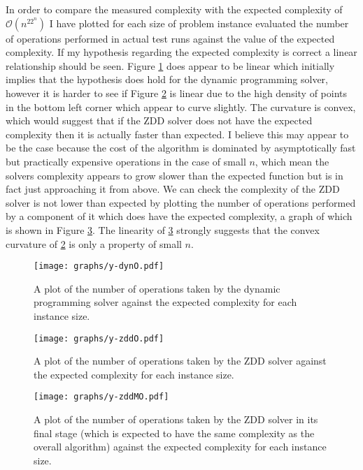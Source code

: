 \documentclass[12pt,a4paper,twoside,openright]{report}
\begin{document}
In order to compare the measured complexity with the expected complexity of $\mathcal{O}(n^22^n)$ I have plotted for each size of problem instance evaluated the number of operations performed in actual test runs against the value of the expected complexity. If my hypothesis regarding the expected complexity is correct a linear relationship should be seen. Figure \ref{dynoperations} does appear to be linear which initially implies that the hypothesis does hold for the dynamic programming solver, however it is harder to see if Figure \ref{zddoperations} is linear due to the high density of points in the bottom left corner which appear to curve slightly. The curvature is convex, which would suggest that if the ZDD solver does not have the expected complexity then it is actually faster than expected. I believe this may appear to be the case because the cost of the algorithm is dominated by asymptotically fast but practically expensive operations in the case of small $n$, which mean the solvers complexity appears to grow slower than the expected function but is in fact just approaching it from above. We can check the complexity of the ZDD solver is not lower than expected by plotting the number of operations performed by a component of it which does have the expected complexity, a graph of which is shown in Figure \ref{zddmodoperations}. The linearity of \ref{zddmodoperations} strongly suggests that the convex curvature of \ref{zddoperations} is only a property of small $n$.

\begin{figure}[ht]
\centering
\texttt{[image: graphs/y-dynO.pdf]}
\caption{A plot of the number of operations taken by the dynamic programming solver against the expected complexity for each instance size.}
\label{dynoperations}
\end{figure}

\begin{figure}[ht]
\centering
\texttt{[image: graphs/y-zddO.pdf]}
\caption{A plot of the number of operations taken by the ZDD solver against the expected complexity for each instance size.}
\label{zddoperations}
\end{figure}

\begin{figure}[ht]
\centering
\texttt{[image: graphs/y-zddMO.pdf]}
\caption{A plot of the number of operations taken by the ZDD solver in its final stage (which is expected to have the same complexity as the overall algorithm) against the expected complexity for each instance size.}
\label{zddmodoperations}
\end{figure}
\end{document}
